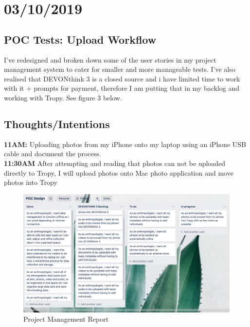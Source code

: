 \documentclass{article}
\begin{document}
\section{03/10/2019}
\subsection{POC Tests: Upload Workflow}
I've redesigned and broken down some of the user stories in my project management system to cater for smaller and more manageable tests. I've also realised that DEVONthink 3 is a closed source and i have limited time to work with it + prompts for payment, therefore I am putting that in my backlog and working with Tropy. See figure 3 below.
\subsection{Thoughts/Intentions}
\textbf{11AM:}  Uploading photos from my iPhone onto my laptop using an iPhone USB cable and document the process.
\\
\textbf{11:30AM} After attempting and reading that photos can not be uploaded directly to Tropy, I will upload photos onto Mac photo application and move photos into Tropy
\\
\begin{figure}[H]
    \centering
    \includegraphics[width=\textwidth]{Images/Trello1.png}
    \caption{Project Management Report}
    \label{fig:my_label}
\end{figure}
\end{document}

